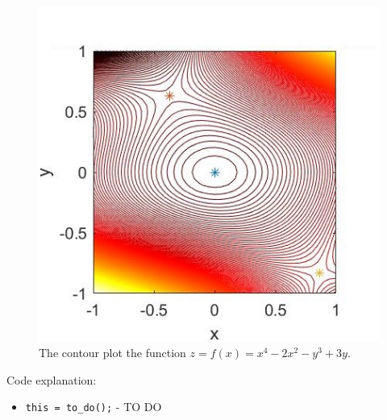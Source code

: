 \begin{figure}[H]
  \centering
  \includegraphics[width=12cm]{graphics/1b.jpg}
  \caption{The contour plot the function $ z = f(x) = x^4 - 2x^2 - y^3 + 3y $.}
\end{figure}

Code explanation: 
\begin{itemize}
  \item \verb!this = to_do();! - TO DO
\end{itemize}

\vspace*{2cm}